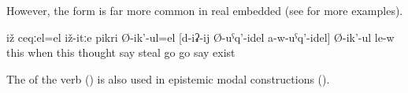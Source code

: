 However, the form  is far more common in real embedded   (see  for more examples).
%
\begin{exe}
	\ex	\label{ex:‎This is when he is probably thinking}
	\gll	iž	ceqːel=el	iž-itːe	pikri	Ø-ik'-ul=el		[d-iʡ-ij	Ø-uˁq'-idel	a-w-uˁq'-idel]	Ø-ik'-ul	le-w\\
		this	when	this	thought	say		steal	go\tsc{.pfv-modq}	go	say	exist\\
	\glt	{}
\end{exe}

The  of the verb  ()  is also used in epistemic modal constructions ().
